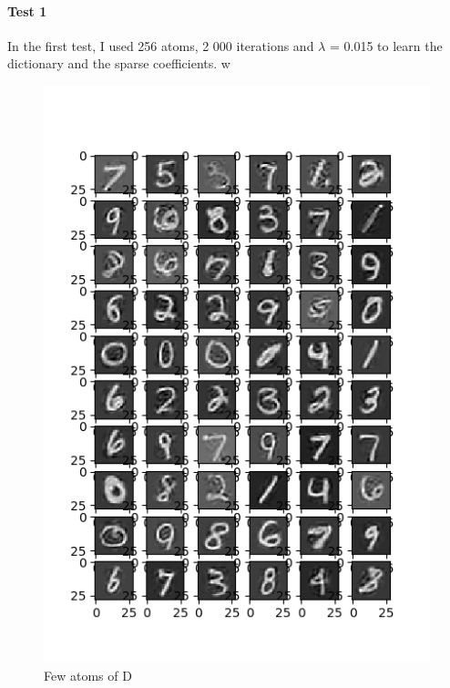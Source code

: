 \documentclass[a4paper,10pt]{article}
\begin{document}
\paragraph{Test 1}
In the first test, I used 256 atoms, 2 000 iterations and $\lambda$ = 0.015 to learn the dictionary and the sparse coefficients. 
w\begin{figure}[h]
 \centering
 \includegraphics[scale=0.82]{Results/SPAMS_X_ALL_K256/D.png}
 \caption{Few atoms of D}
\end{figure}
\end{document}
